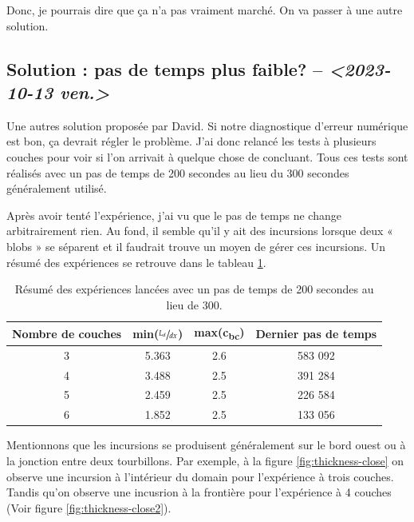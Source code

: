 \documentclass[10pt]{article}
\numberwithin{equation}{section}
\begin{document}
Donc, je pourrais dire que ça n'a pas vraiment marché.
On va passer à une autre solution.

\subsection{Solution : pas de temps plus faible? -- \textit{<2023-10-13 ven.>}}
\label{sec:org9127682}

Une autres solution proposée par David.
Si notre diagnostique d'erreur numérique est bon, ça devrait régler le problème.
J'ai donc relancé les tests à plusieurs couches pour voir si l'on arrivait à quelque chose de concluant.
Tous ces tests sont réalisés avec un pas de temps de 200 secondes au lieu du 300 secondes généralement utilisé.\bigskip

Après avoir tenté l'expérience, j'ai vu que le pas de temps ne change arbitrairement rien.
Au fond, il semble qu'il y ait des incursions lorsque deux « blobs » se séparent et il faudrait trouve un moyen de gérer ces incursions.
Un résumé des expériences se retrouve dans le tableau \ref{tab:orga79b756}.

\begin{table}[htbp]
\caption{\label{tab:orga79b756}Résumé des expériences lancées avec un pas de temps de 200 secondes au lieu de 300.}
\centering
\begin{tabular}{cccc}
\hline
Nombre de couches & min(\(\sfrac{L_d}{dx}\)) & max(c\textsubscript{bc}) & Dernier pas de temps\\[0pt]
\hline
\hline
3 & 5.363 & 2.6 & 583 092\\[0pt]
4 & 3.488 & 2.5 & 391 284\\[0pt]
5 & 2.459 & 2.5 & 226 584\\[0pt]
6 & 1.852 & 2.5 & 133 056\\[0pt]
\hline
\end{tabular}
\end{table}

Mentionnons que les incursions se produisent généralement sur le bord ouest ou à la jonction entre deux tourbillons.
Par exemple, à la figure \ref{fig:thickness-close} on observe une incursion à l'intérieur du domain pour l'expérience à trois couches.
Tandis qu'on observe une incusrion à la frontière pour l'expérience à 4 couches (Voir figure \ref{fig:thickness-close2}).
\end{document}
